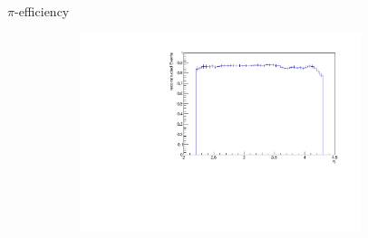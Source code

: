 \documentclass[11pt]{beamer}
\begin{document}
\begin{frame}{$\pi$-efficiency}
\begin{figure}
\begin{subfigure}{0.45\textwidth}
\end{subfigure}
\begin{subfigure}{0.45\textwidth}
\includegraphics[width=0.9\textwidth]{up_pdf/neg/h_eta_reco_Pi_neg.pdf}
\end{subfigure}
\end{figure}
\end{frame}
\end{document}
